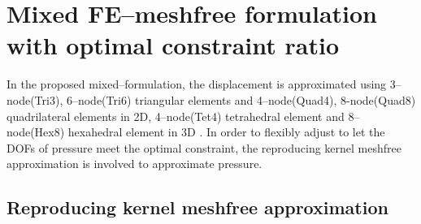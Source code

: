 \section{Mixed FE--meshfree formulation with optimal constraint ratio}

In the proposed mixed--formulation, the displacement is approximated using 3--node(Tri3), 6--node(Tri6) triangular elements and 4--node(Quad4), 8-node(Quad8) quadrilateral elements in 2D, 4--node(Tet4) tetrahedral element and 8--node(Hex8) hexahedral element in 3D \cite{hughes2000}. In order to flexibly adjust to let the DOFs of pressure meet the optimal constraint, the reproducing kernel meshfree approximation is involved to approximate pressure.

\subsection{Reproducing kernel meshfree approximation}

